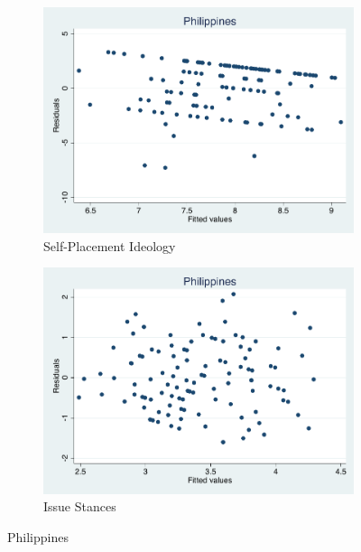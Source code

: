 \documentclass[12pt, titlepage]{article}
\begin{document}
\begin{figure}[H]
	\centering
	\begin{subfigure}[b]{0.475\textwidth}   
		\centering 
		\includegraphics[width=\textwidth]{Residuals/CountryIdeo/Philippines}
		\caption{Self-Placement Ideology}
	\end{subfigure}
	\hfill
	\begin{subfigure}[b]{0.475\textwidth}
		\centering 
		\includegraphics[width=\textwidth]{Residuals/CountryLib/Philippines}
		\caption{Issue Stances}
	\end{subfigure}
	\caption{Philippines}
	\label{Philippines}
\end{figure}
\end{document}
